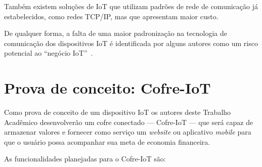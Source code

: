 \documentclass[pdftex, brazil, 12pt, twoside]{article}
\newcommand{\ingles}[1]{\textit{#1}}
\begin{document}
Também existem soluções de IoT que utilizam padrões de rede de comunicação já estabelecidos,
como redes TCP/IP, mas que apresentam maior custo.

De qualquer forma, a falta de uma maior padronização na tecnologia de
comunicação dos dispositivos IoT é identificada por alguns autores
como um risco potencial ao ``negócio IoT''~\citep{UKGOSWalportIoT2014}.


\section{Prova de conceito: Cofre-IoT}
\label{cofre-iot}

Como prova de conceito de um dispositivo IoT os autores deste Trabalho Acadêmico
desenvolverão um cofre conectado --- Cofre-IoT --- que será capaz de armazenar
valores e fornecer como serviço um \ingles{website} ou aplicativo \ingles{mobile}
para que o usuário possa acompanhar sua meta de economia financeira.

As funcionalidades planejadas para o Cofre-IoT são:
\end{document}
